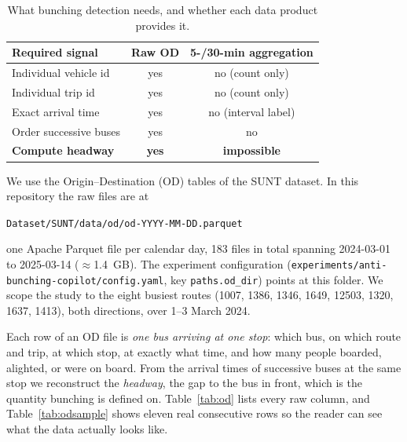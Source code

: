 \documentclass[final,5p,times,twocolumn,authoryear]{elsarticle}
\begin{document}
\begin{table}[t]
\centering
\caption{What bunching detection needs, and whether each data product provides it.}
\label{tab:schema}
\begin{tabular}{lcc}
\toprule
Required signal & Raw OD & 5-/30-min aggregation \\
\midrule
Individual vehicle id        & yes & no (count only) \\
Individual trip id           & yes & no (count only) \\
Exact arrival time           & yes & no (interval label) \\
Order successive buses       & yes & no \\
\textbf{Compute headway}     & \textbf{yes} & \textbf{impossible} \\
\bottomrule
\end{tabular}
\end{table}

We use the Origin--Destination (OD) tables of the SUNT dataset. In this repository the raw files are
at
\begin{center}
\texttt{Dataset/SUNT/data/od/od-YYYY-MM-DD.parquet}
\end{center}
one Apache Parquet file per calendar day, 183 files in total spanning 2024-03-01 to 2025-03-14
($\approx$1.4~GB). The experiment configuration
(\texttt{experiments/anti-bunching-copilot/config.yaml}, key \texttt{paths.od\_dir}) points at this
folder. We scope the study to the eight busiest routes (1007, 1386, 1346, 1649, 12503, 1320, 1637,
1413), both directions, over 1--3 March 2024.

Each row of an OD file is \emph{one bus arriving at one stop}: which bus, on which route and trip, at
which stop, at exactly what time, and how many people boarded, alighted, or were on board. From the
arrival times of successive buses at the same stop we reconstruct the \emph{headway}, the gap to the
bus in front, which is the quantity bunching is defined on. Table~\ref{tab:od} lists every raw
column, and Table~\ref{tab:odsample} shows eleven real consecutive rows so the reader can see what
the data actually looks like.
\end{document}
